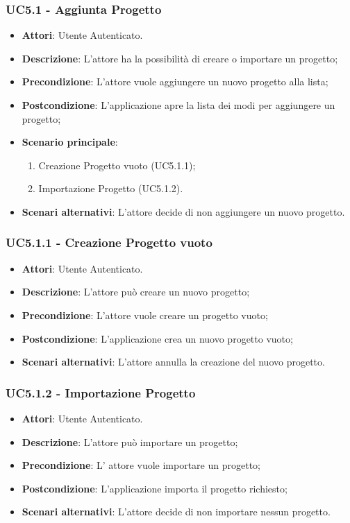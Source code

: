 \subsubsection{UC5.1 - Aggiunta Progetto} 
\label{sssec:UC5.1} 
\begin{itemize} 
\item \textbf{Attori}: Utente Autenticato.
\item \textbf{Descrizione}: L’attore ha la possibilità di creare o importare un progetto;
\item \textbf{Precondizione}: L’attore vuole aggiungere un nuovo progetto alla lista;
\item \textbf{Postcondizione}: L’applicazione apre la lista dei modi per aggiungere un progetto;
\item \textbf{Scenario principale}: \begin{enumerate}\item Creazione Progetto vuoto (UC5.1.1);\item Importazione Progetto (UC5.1.2). 
 \end{enumerate}
\item \textbf{Scenari alternativi}: L'attore decide di non aggiungere un nuovo progetto.
\end{itemize} 
\subsubsection{UC5.1.1 - Creazione Progetto vuoto} 
\label{sssec:UC5.1.1} 
\begin{itemize} 
\item \textbf{Attori}: Utente Autenticato.
\item \textbf{Descrizione}: L'attore può creare un nuovo progetto;
\item \textbf{Precondizione}: L'attore vuole creare un progetto vuoto;
\item \textbf{Postcondizione}: L'applicazione crea un nuovo progetto vuoto;
\item \textbf{Scenari alternativi}: L'attore annulla la creazione del nuovo progetto.
\end{itemize} 
\subsubsection{UC5.1.2 - Importazione Progetto} 
\label{sssec:UC5.1.2} 
\begin{itemize} 
\item \textbf{Attori}: Utente Autenticato.
\item \textbf{Descrizione}: L'attore può importare un progetto;
\item \textbf{Precondizione}: L' attore vuole importare un progetto;
\item \textbf{Postcondizione}: L'applicazione importa il progetto richiesto;
\item \textbf{Scenari alternativi}: L'attore decide di non importare nessun progetto.
\end{itemize} 
